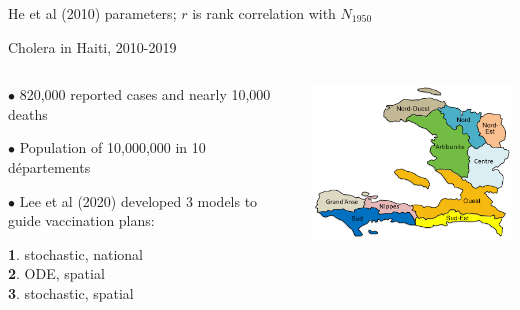 \documentclass{beamer}
\begin{document}
\begin{frame}{He et al (2010) parameters; $r$ is rank correlation with $N_{1950}$}
\end{frame}


\begin{frame}{Cholera in Haiti, 2010-2019}


  
\begin{columns}[T] %

\begin{column}{.35\textwidth}
  \vspace{5mm}
  
$\bullet$  820,000 reported cases and nearly 10,000 deaths

    \vspace{5mm}

$\bullet$  Population of 10,000,000 in 10 d\'{e}partements

    \vspace{5mm}
    
    $\bullet$  Lee et al (2020) developed 3 models to guide vaccination plans:

    \vspace{1mm}
    
    {\bf 1}. stochastic, national \\
    {\bf 2}. ODE, spatial \\
    {\bf 3}. stochastic, spatial

\end{column}

\begin{column}{.62\textwidth}
  \includegraphics[width=7.5cm]{haiti/haiti.png}


\end{column}
\end{columns}
\end{frame}
\end{document}
